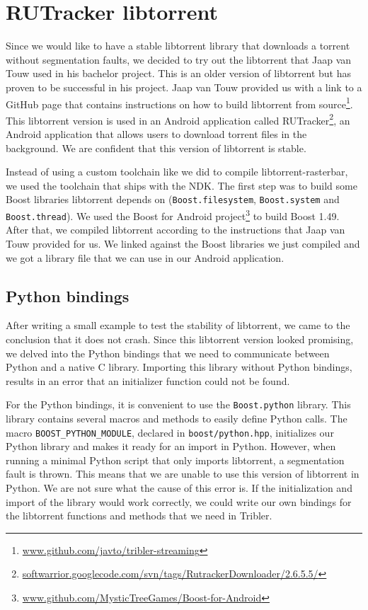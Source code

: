 	\section{RUTracker libtorrent}
		Since we would like to have a stable libtorrent library that downloads a torrent without segmentation faults, we decided to try out the libtorrent that Jaap van Touw used in his bachelor project. This is an older version of libtorrent but has proven to be successful in his project. Jaap van Touw provided us with a link to a GitHub page that contains instructions on how to build libtorrent from source\footnote{\href{https://github.com/javto/tribler-streaming}{www.github.com/javto/tribler-streaming}}. This libtorrent version is used in an Android application called RUTracker\footnote{\href{http://softwarrior.googlecode.com/svn/tags/RutrackerDownloader/2.6.5.5/}{softwarrior.googlecode.com/svn/tags/RutrackerDownloader/2.6.5.5/}}, an Android application that allows users to download torrent files in the background. We are confident that this version of libtorrent is stable.
		
		Instead of using a custom toolchain like we did to compile libtorrent-rasterbar, we used the toolchain that ships with the NDK. The first step was to build some Boost libraries libtorrent depends on (\texttt{Boost.filesystem}, \texttt{Boost.system} and \texttt{Boost.thread}). We used the Boost for Android project\footnote{\href{https://github.com/MysticTreeGames/Boost-for-Android}{www.github.com/MysticTreeGames/Boost-for-Android}} to build Boost 1.49. After that, we compiled libtorrent according to the instructions that Jaap van Touw provided for us. We linked against the Boost libraries we just compiled and we got a library file that we can use in our Android application.
		
		\subsection{Python bindings}
			After writing a small example to test the stability of libtorrent, we came to the conclusion that it does not crash. Since this libtorrent version looked promising, we delved into the Python bindings that we need to communicate between Python and a native C library. Importing this library without Python bindings, results in an error that an initializer function could not be found.
		
			For the Python bindings, it is convenient to use the \texttt{Boost.python} library. This library contains several macros and methods to easily define Python calls. The macro \texttt{BOOST\_PYTHON\_MODULE}, declared in \texttt{boost/python.hpp}, initializes our Python library and makes it ready for an import in Python. However, when running a minimal Python script that only imports libtorrent, a segmentation fault is thrown. This means that we are unable to use this version of libtorrent in Python. We are not sure what the cause of this error is. If the initialization and import of the library would work correctly, we could write our own bindings for the libtorrent functions and methods that we need in Tribler.
			
